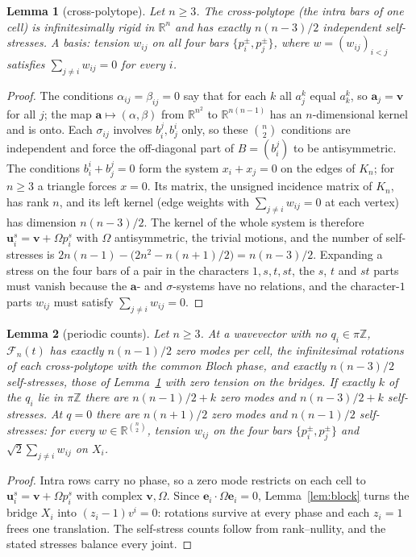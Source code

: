 \documentclass[11pt]{amsart}
\newtheorem{lemma}{Lemma}
\theoremstyle{definition}
\theoremstyle{remark}
\newcommand{\R}{\mathbb{R}}
\newcommand{\Z}{\mathbb{Z}}
\newcommand{\e}{\mathbf{e}}
\newcommand{\vu}{\mathbf{u}}
\newcommand{\va}{\mathbf{a}}
\newcommand{\vv}{\mathbf{v}}
\begin{document}
\begin{lemma}[cross-polytope]\label{lem:cross}
Let $n\ge3$. The cross-polytope (the intra bars of one cell) is infinitesimally rigid in $\R^n$ and has exactly $n(n-3)/2$ independent self-stresses. A basis: tension $w_{ij}$ on all four bars $\{p_i^\pm,p_j^\pm\}$, where $w=(w_{ij})_{i<j}$ satisfies $\sum_{j\ne i}w_{ij}=0$ for every $i$.
\end{lemma}

\begin{proof}
The conditions $\alpha_{ij}=\beta_{ij}=0$ say that for each $k$ all $a_j^k$ equal $a_k^k$, so $\va_j=\vv$ for all $j$; the map $\va\mapsto(\alpha,\beta)$ from $\R^{n^2}$ to $\R^{n(n-1)}$ has an $n$-dimensional kernel and is onto. Each $\sigma_{ij}$ involves $b_i^j,b_j^i$ only, so these $\binom n2$ conditions are independent and force the off-diagonal part of $B=(b_i^j)$ to be antisymmetric. The conditions $b_i^i+b_j^j=0$ form the system $x_i+x_j=0$ on the edges of $K_n$; for $n\ge3$ a triangle forces $x=0$. Its matrix, the unsigned incidence matrix of $K_n$, has rank $n$, and its left kernel (edge weights with $\sum_{j\ne i}w_{ij}=0$ at each vertex) has dimension $n(n-3)/2$. The kernel of the whole system is therefore $\vu_i^s=\vv+\Omega p_i^s$ with $\Omega$ antisymmetric, the trivial motions, and the number of self-stresses is $2n(n-1)-\bigl(2n^2-n(n+1)/2\bigr)=n(n-3)/2$. Expanding a stress on the four bars of a pair in the characters $1,s,t,st$, the $s$, $t$ and $st$ parts must vanish because the $\va$- and $\sigma$-systems have no relations, and the character-$1$ parts $w_{ij}$ must satisfy $\sum_{j\ne i}w_{ij}=0$.
\end{proof}

\begin{lemma}[periodic counts]\label{lem:bloch}
Let $n\ge3$. At a wavevector with no $q_i\in\pi\Z$, $\mathcal F_n(t)$ has exactly $n(n-1)/2$ zero modes per cell, the infinitesimal rotations of each cross-polytope with the common Bloch phase, and exactly $n(n-3)/2$ self-stresses, those of Lemma~\ref{lem:cross} with zero tension on the bridges. If exactly $k$ of the $q_i$ lie in $\pi\Z$ there are $n(n-1)/2+k$ zero modes and $n(n-3)/2+k$ self-stresses. At $q=0$ there are $n(n+1)/2$ zero modes and $n(n-1)/2$ self-stresses: for every $w\in\R^{\binom n2}$, tension $w_{ij}$ on the four bars $\{p_i^\pm,p_j^\pm\}$ and $\sqrt2\sum_{j\ne i}w_{ij}$ on $X_i$.
\end{lemma}

\begin{proof}
Intra rows carry no phase, so a zero mode restricts on each cell to $\vu_i^s=\vv+\Omega p_i^s$ with complex $\vv,\Omega$. Since $\e_i\cdot\Omega\e_i=0$, Lemma~\ref{lem:block} turns the bridge $X_i$ into $(z_i-1)v^i=0$: rotations survive at every phase and each $z_i=1$ frees one translation. The self-stress counts follow from rank--nullity, and the stated stresses balance every joint.
\end{proof}
\end{document}
